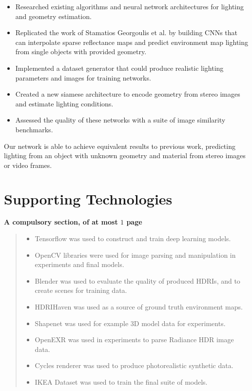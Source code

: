 \documentclass[ %
                    author={Gavin Parker},
                supervisor={Dr. Neill Campbell},
                    degree={MEng},
                     title={Deep Siamese Networks for Illumination Estimation from Stereo Images},
                  subtitle={},
                      type={research},
                      year={2018} ]{dissertation}
\begin{document}
\noindent
\begin{itemize}
\item Researched existing algorithms and neural network architectures for lighting and geometry estimation.
\item Replicated the work of Stamatios Georgoulis et al. by building CNNs that can interpolate sparse reflectance maps and predict environment map lighting from single objects with provided geometry.
\item Implemented a dataset generator that could produce realistic lighting parameters and images for training networks.
\item Created a new siamese architecture to encode geometry from stereo images and estimate lighting conditions.
\item Assessed the quality of these networks with a suite of image similarity benchmarks.
\end{itemize}

Our network is able to achieve equivalent results to previous work, predicting lighting from an object with unknown geometry and material from stereo images or video frames.
\chapter*{Supporting Technologies}

{\bf A compulsory section, of at most $1$ page}
\vspace{1cm} 
\begin{quote}
\noindent
\begin{itemize}
\item Tensorflow was used to construct and train deep learning models.
\item OpenCV libraries were used for image parsing and manipulation in experiments and final models.
\item Blender was used to evaluate the quality of produced HDRIs, and to create scenes for training data.
\item HDRIHaven was used as a source of ground truth environment maps.
\item Shapenet was used for example 3D model data for experiments.
\item OpenEXR was used in experiments to parse Radiance HDR image data.
\item Cycles renderer was used to produce photorealistic synthetic data.
\item IKEA Dataset was used to train the final suite of models.
\end{itemize}
\end{quote}
\end{document}
